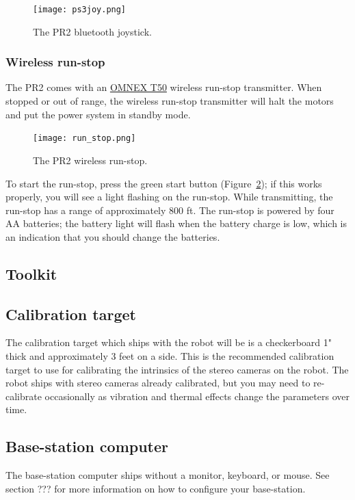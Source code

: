 \begin{figure}[h]
\centering
\texttt{[image: ps3joy.png]}
\caption{The PR2 bluetooth joystick.}
\label{fig:ps3joy}
\end{figure}

\subsubsection{Wireless run-stop}
\label{wirelessrunstop}
The PR2 comes with an \href{http://www.omnexcontrols.com/products/portable/t50.html}{OMNEX T50} 
wireless run-stop transmitter. When stopped or out of range, the wireless run-stop transmitter will halt the motors 
and put the power system in standby mode. 

\begin{figure}[h]
\centering
\texttt{[image: run\_stop.png]}
\caption{The PR2 wireless run-stop.}
\label{fig:runstop}
\end{figure}

To start the run-stop, press the green start button (Figure~\ref{fig:runstop}); if this works properly, you will see a 
light flashing on the run-stop. While transmitting, the run-stop has a range of approximately 800 ft. The run-stop is 
powered by four AA batteries; the battery light will flash when the battery charge is low, which is an indication that 
you should change the batteries.


\subsection{Toolkit}

\subsection{Calibration target}
The calibration target which ships with the robot will be is a checkerboard 1" thick and approximately 3 feet on a side.  This is the recommended calibration target to use for calibrating the intrinsics of the stereo cameras on the robot.  The robot ships with stereo cameras already calibrated, but you may need to re-calibrate occasionally as vibration and thermal effects change the parameters over time.

\subsection{Base-station computer}
The base-station computer ships without a monitor, keyboard, or mouse.  See section ??? for more information on how to configure your base-station.

